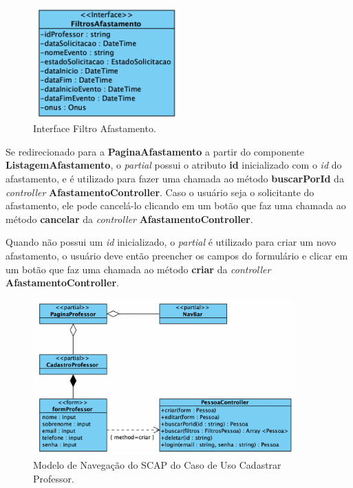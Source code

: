 \begin{figure}
    \centering
    \includegraphics[width=0.5\textwidth]{figuras/fig-interface-filtro-afast.png}
    \caption{Interface Filtro Afastamento.}
    \label{fig-interface-filtro-afast}
\end{figure}

Se redirecionado para a \textbf{PaginaAfastamento} a partir do componente \textbf{ListagemAfastamento},
o \textit{partial} possui o atributo \textbf{id} inicializado com o \textit{id} do afastamento, e é
utilizado para fazer uma chamada ao método \textbf{buscarPorId} da \textit{controller} \textbf{AfastamentoController}.
Caso o usuário seja o solicitante do afastamento, ele pode cancelá-lo clicando em um botão que faz uma chamada ao método
\textbf{cancelar} da \textit{controller} \textbf{AfastamentoController}.

Quando não possui um \textit{id} inicializado, o \textit{partial} é utilizado para criar um novo afastamento,
o usuário deve então preencher os campos do formulário e clicar em um botão que faz uma chamada ao método
\textbf{criar} da \textit{controller} \textbf{AfastamentoController}.


\begin{figure}
    \centering
    \includegraphics[width=0.9\textwidth]{figuras/fig-modelo-naveg-cadast.png}
    \caption{Modelo de Navegação do SCAP do Caso de Uso Cadastrar Professor.}
    \label{fig-modelo-navegacao-professor}
\end{figure}

